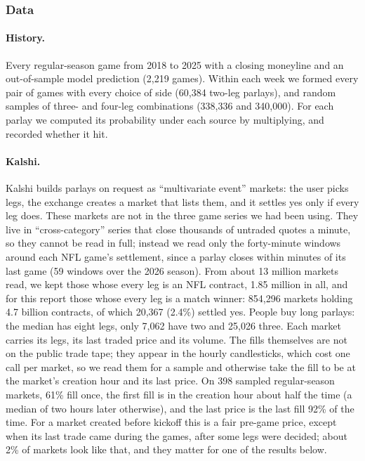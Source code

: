 \subsubsection{Data}

\paragraph{History.} Every regular-season game from 2018 to 2025 with a closing moneyline and an out-of-sample model prediction (2,219 games). Within each week we formed every pair of games with every choice of side (60,384 two-leg parlays), and random samples of three- and four-leg combinations (338,336 and 340,000). For each parlay we computed its probability under each source by multiplying, and recorded whether it hit.

\paragraph{Kalshi.} Kalshi builds parlays on request as ``multivariate event'' markets: the user picks legs, the exchange creates a market that lists them, and it settles yes only if every leg does. These markets are not in the three game series we had been using. They live in ``cross-category'' series that close thousands of untraded quotes a minute, so they cannot be read in full; instead we read only the forty-minute windows around each NFL game's settlement, since a parlay closes within minutes of its last game (59 windows over the 2026 season). From about 13 million markets read, we kept those whose every leg is an NFL contract, 1.85 million in all, and for this report those whose every leg is a match winner: 854,296 markets holding 4.7 billion contracts, of which 20,367 (2.4\%) settled yes. People buy long parlays: the median has eight legs, only 7,062 have two and 25,026 three. Each market carries its legs, its last traded price and its volume. The fills themselves are not on the public trade tape; they appear in the hourly candlesticks, which cost one call per market, so we read them for a sample and otherwise take the fill to be at the market's creation hour and its last price. On 398 sampled regular-season markets, 61\% fill once, the first fill is in the creation hour about half the time (a median of two hours later otherwise), and the last price is the last fill 92\% of the time. For a market created before kickoff this is a fair pre-game price, except when its last trade came during the games, after some legs were decided; about 2\% of markets look like that, and they matter for one of the results below.

